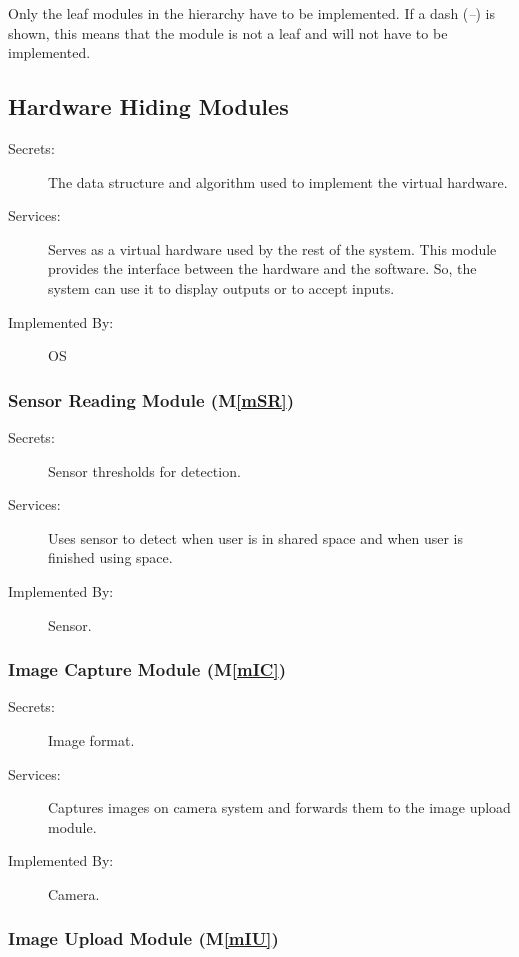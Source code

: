 \documentclass[12pt, titlepage]{article}
\newcommand{\mref}[1]{M\ref{#1}}
\begin{document}
Only the leaf modules in the hierarchy have to be implemented. If a dash
(\emph{--}) is shown, this means that the module is not a leaf and will not have
to be implemented.

\subsection{Hardware Hiding Modules}

\begin{description}
\item[Secrets:] The data structure and algorithm used to implement the virtual hardware.
\item[Services:] Serves as a virtual hardware used by the rest of the system. This module provides the interface between the hardware and the software. So, the system can use it to display outputs or to accept inputs.
\item[Implemented By:] OS
\end{description}

\subsubsection{Sensor Reading Module (\mref{mSR})}

\begin{description}
\item[Secrets:]Sensor thresholds for detection.
\item[Services:]Uses sensor to detect when user is in shared space and when user is finished using space.
\item[Implemented By:] Sensor.
\end{description}

\subsubsection{Image Capture Module (\mref{mIC})}

\begin{description}
\item[Secrets:] Image format.
\item[Services:] Captures images on camera system and forwards them to the image upload module.
\item[Implemented By:] Camera.
\end{description}

\subsubsection{Image Upload Module (\mref{mIU})}
\end{document}
